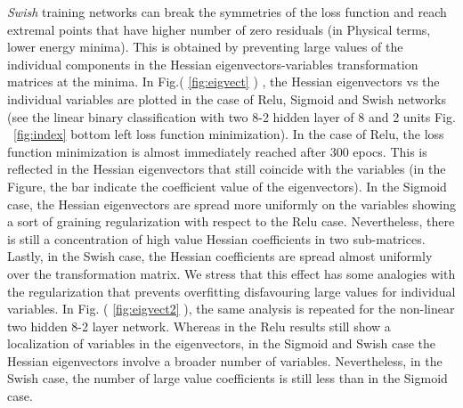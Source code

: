 \documentclass[5p]{elsarticle}
\begin{document}
  {\it Swish} training networks can break the symmetries of the loss function and reach extremal points that have higher number of zero residuals (in Physical terms, lower energy minima).
  This is obtained by preventing large values of the individual components in the Hessian eigenvectors-variables transformation matrices at the minima. In Fig.( \ref{fig:eigvect} ) , the Hessian eigenvectors vs the individual variables are plotted in the case of Relu, Sigmoid and Swish networks (see the linear binary classification with two 8-2 hidden layer of 8 and 2 units Fig. ~\eqref{fig:index} bottom left loss function minimization). In the case of Relu, the loss function minimization is almost immediately reached after 300 epocs. This is reflected in the Hessian eigenvectors that still coincide with the variables (in the Figure, the bar indicate the coefficient value of the eigenvectors). In the Sigmoid case, the Hessian eigenvectors are spread more uniformly on the variables showing a sort of graining regularization with respect to the Relu case. Nevertheless, there is still a concentration of high value Hessian coefficients in two sub-matrices. Lastly, in the Swish case, the Hessian coefficients are spread almost uniformly over the transformation matrix. We stress that this effect has some analogies with the regularization that prevents overfitting disfavouring large values for individual variables.
  In Fig. ( \ref{fig:eigvect2} ), the same analysis is repeated for the non-linear two hidden 8-2 layer network. Whereas in the Relu results still show a localization of variables in the eigenvectors, in the Sigmoid and Swish case the Hessian eigenvectors involve a broader number of variables. Nevertheless, in the Swish case, the number of large value coefficients is still less than in the Sigmoid case.
%
\end{document}
